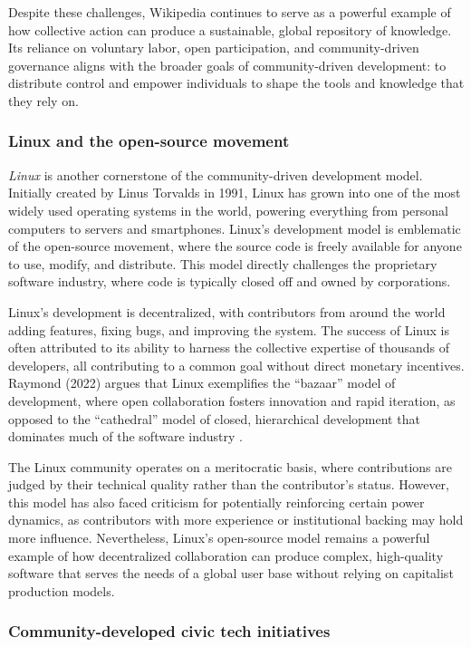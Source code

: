 \begin{refsection}
Despite these challenges, Wikipedia continues to serve as a powerful example of how collective action can produce a sustainable, global repository of knowledge. Its reliance on voluntary labor, open participation, and community-driven governance aligns with the broader goals of community-driven development: to distribute control and empower individuals to shape the tools and knowledge that they rely on.

\subsubsection{Linux and the open-source movement}

\textit{Linux} is another cornerstone of the community-driven development model. Initially created by Linus Torvalds in 1991, Linux has grown into one of the most widely used operating systems in the world, powering everything from personal computers to servers and smartphones. Linux's development model is emblematic of the open-source movement, where the source code is freely available for anyone to use, modify, and distribute. This model directly challenges the proprietary software industry, where code is typically closed off and owned by corporations.

Linux’s development is decentralized, with contributors from around the world adding features, fixing bugs, and improving the system. The success of Linux is often attributed to its ability to harness the collective expertise of thousands of developers, all contributing to a common goal without direct monetary incentives. Raymond (2022) argues that Linux exemplifies the “bazaar” model of development, where open collaboration fosters innovation and rapid iteration, as opposed to the “cathedral” model of closed, hierarchical development that dominates much of the software industry \cite[pp.~59-61]{raymond2022}. 

The Linux community operates on a meritocratic basis, where contributions are judged by their technical quality rather than the contributor’s status. However, this model has also faced criticism for potentially reinforcing certain power dynamics, as contributors with more experience or institutional backing may hold more influence. Nevertheless, Linux’s open-source model remains a powerful example of how decentralized collaboration can produce complex, high-quality software that serves the needs of a global user base without relying on capitalist production models.

\subsubsection{Community-developed civic tech initiatives}


\end{refsection}
